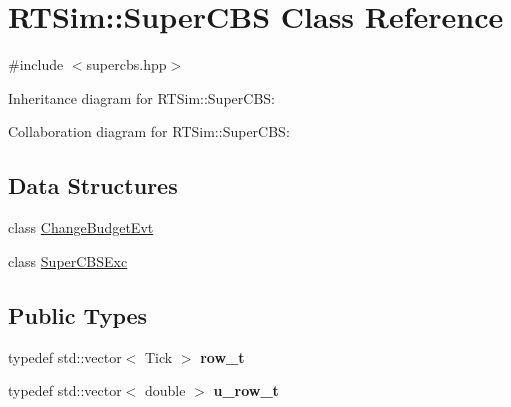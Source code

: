 \hypertarget{classRTSim_1_1SuperCBS}{}\section{R\+T\+Sim\+:\+:Super\+C\+BS Class Reference}
\label{classRTSim_1_1SuperCBS}


{\ttfamily \#include $<$supercbs.\+hpp$>$}



Inheritance diagram for R\+T\+Sim\+:\+:Super\+C\+BS\+:


Collaboration diagram for R\+T\+Sim\+:\+:Super\+C\+BS\+:
\subsection*{Data Structures}
\begin{DoxyCompactItemize}
\item 
class \hyperlink{classRTSim_1_1SuperCBS_1_1ChangeBudgetEvt}{Change\+Budget\+Evt}
\item 
class \hyperlink{classRTSim_1_1SuperCBS_1_1SuperCBSExc}{Super\+C\+B\+S\+Exc}
\end{DoxyCompactItemize}
\subsection*{Public Types}
\begin{DoxyCompactItemize}
\item 
typedef std\+::vector$<$ Tick $>$ {\bfseries row\+\_\+t}\hypertarget{classRTSim_1_1SuperCBS_aa0332b1488d4da4d50bb4e62cfc9a47d}{}\label{classRTSim_1_1SuperCBS_aa0332b1488d4da4d50bb4e62cfc9a47d}

\item 
typedef std\+::vector$<$ double $>$ {\bfseries u\+\_\+row\+\_\+t}\hypertarget{classRTSim_1_1SuperCBS_a6351666534171968d8394c2801bf6fbf}{}\label{classRTSim_1_1SuperCBS_a6351666534171968d8394c2801bf6fbf}

\end{DoxyCompactItemize}
